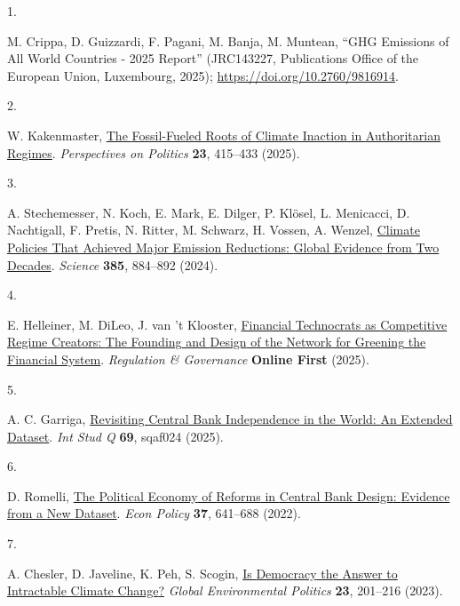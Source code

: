 \documentclass[
  12pt,
  letterpaper,
]{article}
\newlength{\cslhangindent}
\newlength{\csllabelwidth}
\newenvironment{CSLReferences}[2] %
 {\begin{list}{}{%
  \setlength{\itemindent}{0pt}
  \setlength{\leftmargin}{0pt}
  \setlength{\parsep}{0pt}
  \ifodd #1
   \setlength{\leftmargin}{\cslhangindent}
   \setlength{\itemindent}{-1\cslhangindent}
  \fi
  \setlength{\itemsep}{#2\baselineskip}}}
 {\end{list}}
\newcommand{\CSLLeftMargin}[1]{\parbox[t]{\csllabelwidth}{\strut#1\strut}}
\newcommand{\CSLRightInline}[1]{\parbox[t]{\linewidth - \csllabelwidth}{\strut#1\strut}}
\begin{document}
\protect{}\label{refs}
\begin{CSLReferences}{0}{1}
\CSLLeftMargin{1. }%
\CSLRightInline{M. Crippa, D. Guizzardi, F. Pagani, M. Banja, M.
Muntean, {``{GHG Emissions} of {All World Countries} - 2025 {Report}''}
(JRC143227, Publications Office of the European Union, Luxembourg,
2025); \url{https://doi.org/10.2760/9816914}.}

\CSLLeftMargin{2. }%
\CSLRightInline{W. Kakenmaster,
\href{https://doi.org/10.1017/S1537592724000793}{The {Fossil-Fueled
Roots} of {Climate Inaction} in {Authoritarian Regimes}}.
\emph{Perspectives on Politics} \textbf{23}, 415--433 (2025).}

\CSLLeftMargin{3. }%
\CSLRightInline{A. Stechemesser, N. Koch, E. Mark, E. Dilger, P. Klösel,
L. Menicacci, D. Nachtigall, F. Pretis, N. Ritter, M. Schwarz, H.
Vossen, A. Wenzel,
\href{https://doi.org/10.1126/science.adl6547}{Climate {Policies That
Achieved Major Emission Reductions}: {Global Evidence} from {Two
Decades}}. \emph{Science} \textbf{385}, 884--892 (2024).}

\CSLLeftMargin{4. }%
\CSLRightInline{E. Helleiner, M. DiLeo, J. van 't Klooster,
\href{https://doi.org/10.1111/rego.12629}{Financial {Technocrats} as
{Competitive Regime Creators}: {The Founding} and {Design} of the
{Network} for {Greening} the {Financial System}}. \emph{Regulation \&
Governance} \textbf{Online First} (2025).}

\CSLLeftMargin{5. }%
\CSLRightInline{A. C. Garriga,
\href{https://doi.org/10.1093/isq/sqaf024}{Revisiting {Central Bank
Independence} in the {World}: {An Extended Dataset}}. \emph{Int Stud Q}
\textbf{69}, sqaf024 (2025).}

\CSLLeftMargin{6. }%
\CSLRightInline{D. Romelli,
\href{https://doi.org/10.1093/epolic/eiac011}{The {Political Economy} of
{Reforms} in {Central Bank Design}: {Evidence} from a {New Dataset}}.
\emph{Econ Policy} \textbf{37}, 641--688 (2022).}

\CSLLeftMargin{7. }%
\CSLRightInline{A. Chesler, D. Javeline, K. Peh, S. Scogin,
\href{https://doi.org/10.1162/glep_a_00710}{Is {Democracy} the {Answer}
to {Intractable Climate Change}?} \emph{Global Environmental Politics}
\textbf{23}, 201--216 (2023).}


\end{CSLReferences}
\end{document}
